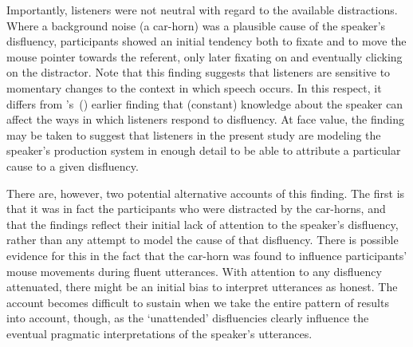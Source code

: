 \documentclass[a4paper,man,natbib]{apa6}
\newcommand*{\citegen}[1]{\citeauthor{#1}'s~(\citeyear{#1})}
\begin{document}
Importantly, listeners were not neutral with regard to the available distractions.
Where a background noise (a car-horn) was a plausible cause of the speaker's disfluency, participants showed an initial tendency both to fixate and to move the mouse pointer towards the referent, only later fixating on and eventually clicking on the distractor.
Note that this finding suggests that listeners are sensitive to momentary changes to the context in which speech occurs.
In this respect, it differs from \citegen{Arnold2007} earlier finding that (constant) knowledge about the speaker can affect the ways in which listeners respond to disfluency.
At face value, the finding may be taken to suggest that listeners in the present study are modeling the speaker's production system in enough detail to be able to attribute a particular cause to a given disfluency.

There are, however, two potential alternative accounts of this finding.
The first is that it was in fact the participants who were distracted by the car-horns, and that the findings reflect their initial lack of attention to the speaker's disfluency, rather than any attempt to model the cause of that disfluency.
There is possible evidence for this in the fact that the car-horn was found to influence participants' mouse movements during fluent utterances. 
With attention to any disfluency attenuated, there might be an initial bias to interpret utterances as honest. 
The account becomes difficult to sustain when we take the entire pattern of results into account, though, as the `unattended' disfluencies clearly influence the eventual pragmatic interpretations of the speaker's utterances.
\end{document}

